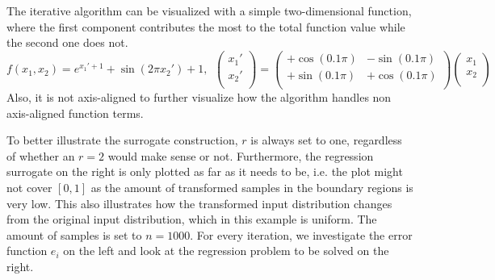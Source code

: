 \documentclass[
  a4paper,  %
  twoside,  %
  bibliography=totoc,
  headsepline,
  cleardoublepage=empty,
  parskip=half,
  draft=false
]{scrbook}
\begin{document}
The iterative algorithm can be visualized with a simple two-dimensional function, where the first component contributes the most to the total function value while the second one does not.
\begin{equation}
f(x_1, x_2)=e^{x_1' + 1} + \sin(2 \pi x_2') + 1, ~~ \begin{pmatrix}
    x_1' \\ x_2'
    \\
  \end{pmatrix} = \begin{pmatrix}
    +\cos(0.1 \pi) & -\sin(0.1 \pi)\\
    +\sin(0.1 \pi) & +\cos(0.1 \pi)
    \\
  \end{pmatrix}\begin{pmatrix}
    x_1 \\ x_2
    \\
  \end{pmatrix}
\end{equation}
Also, it is not axis-aligned to further visualize how the algorithm handles non axis-aligned function terms.

To better illustrate the surrogate construction, $r$ is always set to one, regardless of whether an $r=2$ would make sense or not.
Furthermore, the regression surrogate on the right is only plotted as far as it needs to be, i.e. the plot might not cover $[0,1]$ as the amount of transformed samples in the boundary regions is very low.
This also illustrates how the transformed input distribution changes from the original input distribution, which in this example is uniform.
The amount of samples is set to $n=1000$.
For every iteration, we investigate the error function $e_i$ on the left and look at the regression problem to be solved on the right.
\end{document}
